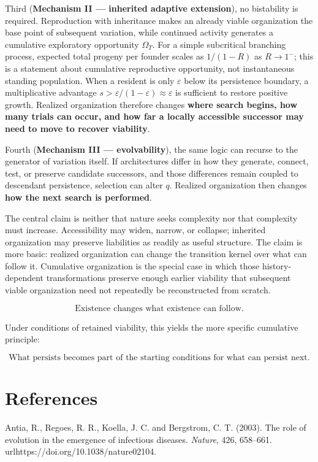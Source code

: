 \documentclass[11pt]{article}
\begin{document}
Third (\textbf{Mechanism II --- inherited adaptive extension}), no
bistability is required. Reproduction with inheritance makes an already
viable organization the base point of subsequent variation, while
continued activity generates a cumulative exploratory opportunity
\(\Omega_T\). For a simple subcritical branching process, expected total
progeny per founder scales as \(1/(1-R)\) as \(R\to1^-\); this is a
statement about cumulative reproductive opportunity, not instantaneous
standing population. When a resident is only \(\varepsilon\) below its
persistence boundary, a multiplicative advantage
\(s>\varepsilon/(1-\varepsilon)\approx\varepsilon\) is sufficient to
restore positive growth. Realized organization therefore changes
\textbf{where search begins, how many trials can occur, and how far a
locally accessible successor may need to move to recover viability}.

Fourth (\textbf{Mechanism III --- evolvability}), the same logic can
recurse to the generator of variation itself. If architectures differ in
how they generate, connect, test, or preserve candidate successors, and
those differences remain coupled to descendant persistence, selection
can alter \(q\). Realized organization then changes \textbf{how the next
search is performed}.

The central claim is neither that nature seeks complexity nor that
complexity must increase. Accessibility may widen, narrow, or collapse;
inherited organization may preserve liabilities as readily as useful
structure. The claim is more basic: realized organization can change the
transition kernel over what can follow it. Cumulative organization is
the special case in which those history-dependent transformations
preserve enough earlier viability that subsequent viable organization
need not repeatedly be reconstructed from scratch.

\[
\boxed{\text{Existence changes what existence can follow.}}
\]

Under conditions of retained viability, this yields the more specific
cumulative principle:

\[
\boxed{\text{What persists becomes part of the starting conditions for what can persist next.}}
\]

\section{References}
Antia, R., Regoes, R. R., Koella, J. C. and Bergstrom, C. T. (2003). The
role of evolution in the emergence of infectious diseases.
\emph{Nature}, 426, 658--661. \\url{https://doi.org/10.1038/nature02104}.
\end{document}
